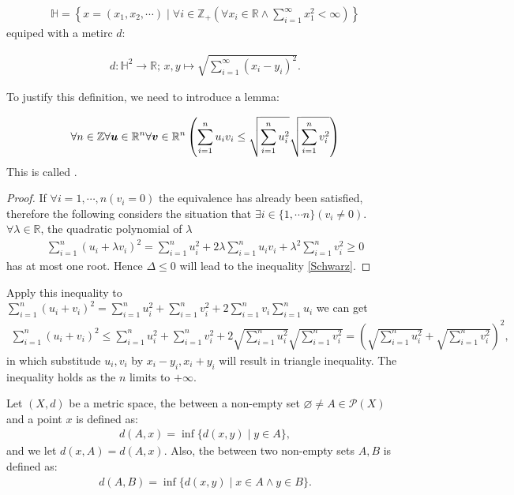 \documentclass[openany]{book}
\begin{document}
\begin{align}
	\mathbb{H}=\left\{ 
		x=(x_1,x_2,\cdots) \mid \forall i\in \mathbb{Z}_+\left( 
			\forall x_i\in \mathbb{R}\wedge \sum^\infty_{i=1} x_1^2 < \infty\right)\right\}
\end{align}
equiped with a metirc $d$:

\begin{align}
	d\colon \mathbb{H}^2\to \mathbb{R}; \,x,y\mapsto \sqrt {\sum^\infty_{i=1} (x_i-y_i)^2 }.
\end{align}

To justify this definition, we need to introduce a lemma:
\begin{lemma}\label{Schwarz_inequality}
\begin{align}\label{Schwarz}
	\forall n\in\mathbb{Z}\forall \boldsymbol{u}\in\mathbb{R}^n\forall \boldsymbol{v}\in\mathbb{R}^n\left(
		\sum^n_{i=1} u_iv_i \leq \sqrt{ \sum^n_{i=1} u_i^2}\sqrt{ \sum^n_{i=1} v_i^2}\right)
\end{align}
This is called .
\end{lemma}
\begin{proof}
If $\forall i=1,\cdots,n ( v_i=0)$ the equivalence has already been satisfied, therefore the following considers the situation that $\exists i\in \{1,\cdots n\}( v_i\neq 0)$. $\forall \lambda \in\mathbb R$, the quadratic polynomial of $\lambda$
\begin{align*}
	\sum ^n_{i=1} (u_i+\lambda v_i)^2 = 
		\sum ^n_{i=1} u_i^2 +2\lambda \sum ^n_{i=1} u_iv_i + \lambda^2 \sum ^n_{i=1} v_i^2 \geq 0
\end{align*}
has at most one root. Hence $\Delta \leq 0$ will lead to the inequality \ref{Schwarz}.
\end{proof}

Apply this inequality to $\sum ^n_{i=1} ( u_i+v_i)^2 = 
	\sum ^n_{i=1} u_i^2 +\sum ^n_{i=1}  v_i^2 +2\sum ^n_{i=1}  v_i\sum ^n_{i=1} u_i$ we can get
\begin{align*}
	\sum ^n_{i=1} ( u_i+v_i)^2 \leq 
		\sum ^n_{i=1} u_i^2 +\sum ^n_{i=1}  v_i^2 +
			2\sqrt{ \sum^n_{i=1} u_i^2}\sqrt{ \sum^n_{i=1} v_i^2} = \left(
				\sqrt{ \sum^n_{i=1} u_i^2}+\sqrt{ \sum^n_{i=1} v_i^2} \right)^2 ,
\end{align*}
in which substitude $u_i,v_i$ by $x_i-y_i, x_i+y_i$ will result in triangle inequality. The inequality holds as the $n$ limits to $+\infty$.

\begin{definition}
Let $(X,d)$ be a metric space, the  between a non-empty set $\varnothing\neq A\in \mathscr P(X)$ and a point $x$ is defined as:
\begin{align*}
	d(A,x) = \inf \{d(x,y)\mid y\in A\},
\end{align*}
and we let $d(x,A) = d(A,x)$. 
Also, the  between two non-empty sets $A,B$ is defined as:
\begin{align*}
	d(A,B) = \inf \{d(x,y)\mid x\in A\wedge y\in B\}.
\end{align*}
\end{definition}
\end{document}
